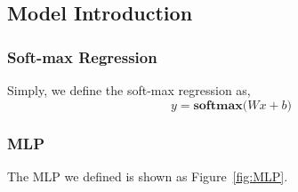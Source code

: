 \documentclass[12pt,letterpaper]{article}
\begin{document}
\subsection{Model Introduction}

\subsubsection*{Soft-max Regression}

Simply, we define the soft-max regression as,
\begin{equation*}
    y = \textbf{softmax}\Big( Wx + b \Big)
\end{equation*}

\subsubsection*{MLP}

The MLP we defined is shown as Figure~\ref{fig:MLP}.

\end{document}
